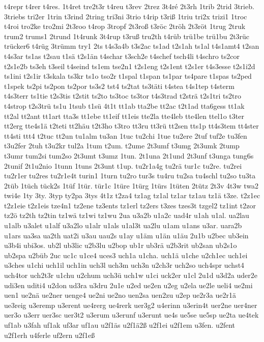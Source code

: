 {t4repr
t4rer
t4res.
1t4ret
tre2t3r
t4reu
t3rev
2trez
3t4ré
2t3rh
1trib
2trid
3trieb.
3triebs
tri2er
1trin
t3rind
2tring
tri3ni
3trio
t4rip
t3riß
1triu
tri2x
trizi1
1troc
t4roi
tro2ke
tro2mi
2t3roo
t4rop
3tropf
2t3roß
t3röc
2tröh
2t3röt
1trug
2truk
trum2
trums1
2trund
1t4runk
3t4rup
t3ruß
tru2th
t4rüb
trü1be
trü1bu
2t3rüc
trücker6
t4rüg
3trümm
try1
2ts
t4s3a4b
t3s2ac
ts1ad
t2s1ah
ts1al
t4s1amt4
t2san
t4s3ar
ts1as
t2sau
t1sä
t2s1än
t4schar
t3sch2e
t4schef
tsch4li
t4schro
ts2cor
t2s1e2b
ts3eh
t3seil
t4seind
ts1em
tse2n1
t2s1eng
t2s1ent
t2s1er
t4s3esse
t2s1i2d
ts1ini
t2s1ir
t3skala
ts3kr
ts1o
tso2r
t1spal
t1span
ts1par
ts4pare
t1spas
ts2ped
t1spek
ts2pi
ts2pon
ts2por
ts3s2
tst4
ts2tat
ts3täti
t4stea
t4s1tep
t4sterm
t4s3terr
ts1tie
t2s3tis
t2stit
ts2to
ts3toc
ts3tor
t4s3trad
t2strä
t2s1tri
ts2tro
t4strop
t2s3trü
ts1u
1tsub
t1sü
4t1t
tt1ab
tta2be
tt2ac
t2t1ad
tta6gess
tt1ak
tt2al
tt2ant
tt1art
tta3s
tt1ebe
tt1eif
tt1eis
tte2la
tte4leb
tte4len
ttel1o
t3ter
tt2erg
tte4s1ä
t2teti
tt2häu
t2t3ho
t3tro
tt3ru
tt3rü
tt2sen
tts1p
tt4s3tem
tt4ster
tt4sti
ttt4
t2tuc
tt2un
tu1alm
tu3an
1tuc
tu2chi
1tue
tu2ere
2tuf
tuf2e
tu3fen
t3u2fer
2tuh
t3u2kr
tul2a
1tum
t2um.
t2ume
2t3umf
t3umg
2t3umk
2tump
t3umr
tum2si
tum2so
2t3umt
t3umz
1tun.
2t1una
2t1und
2t3unf
t3unga
tung6s
2tunif
2t1u2nio
1tunn
1tuns
2t3unt
t1up.
tu2r1a4g
tu2rä
tur1c
tu2re.
tu2rei
tu2r1er
tu2res
tu2r1e4t
turin1
1turn
tu2ro
tur3s
tu4ru
tu2sa
tu4schl
tu2so
tu3ta
2tüb
1tüch
tück2s
1tüf
1tür.
tür1c
1türe
1türg
1türs
1tüten
2tütz
2t3v
4t3w
twa2
twi4e
1ty
3ty.
3typ
ty2pa
3tys
4t1z
t2za4
tz1ag
tz1al
tz1ar
tz1au
tz1ä
t3ze.
t2z1ec
t2z1eie
t2z1eis
tze4n1
tz2ene
tz3ents
tz1erl
tz2ers
t3zes
tzes3t
tzgel2
tz1int
t2zor
tz2ö
tz2th
tz2tin
tz1wä
tz1wi
tz1wu
2ua
u3a2b
u1a2c
uad4r
u1ah
u1al.
ua2lau
u1alb
u3alet
u1alf
u3a2lo
u1alr
u1als
u1al3t
ua2lu
u1am
u1ans
u3ar.
uara2b
u1ars
ua3sa
ua2th
uat2i
u3au
uau2s
u1ay
u1äm
u1än
u1äu
2u1b
u2bec
ub3ein
u3b4i
ubi3os.
ub2l
ub3lic
u2b3lu
u2bop
ub1r
ub3rä
u2b3rit
ub2san
ub2s1o
ub2spa
u2büb
2uc
uc1c
u1ce4
uces3
uch1a
u1cha.
uch1ä
u1che
u2ch1ec
uch1ei
u3ches
u1chi
uch1il
uch1in
uch3l
uch3m
uch3n
u2ch3r
uch2so
uch4spr
uchst4
uch4tor
uch2t3r
u1chu
u2chum
uch3ü
uch1w
u1ci
uck2er
u1cl
2u1d
u3d2a
uder2e
udi3en
uditi4
u2don
ud3ra
u3dru
2u1e
u2ed
ue2en
u2eg
u2ela
ue2le
ueli4
ue2mi
uen1
ue2nä
ue2ner
uenge4
ue2ni
ue2no
uen2sa
uen2zu
u2ep
ue2r3a
ue2r1ä
ue3reig
u3eremp
u3erent
ue4rerg
ue4rerk
uer3g2
u4erinn
u3erin4t
uer2ne
uer4ner
uer3o
u3err
uer3sc
uer3t2
u3erum
u3erunf
u3erunt
ue4s
ue5se
ue5sp
ue2ta
ue4tek
uf1ab
u3fah
uf1ak
uf3ar
uf1au
u2f1äs
u2f1ä2ß
u2f1ei
u2f1em
u3fen.
u2fent
u2f1erh
u4ferle
uf2ern
u2f1eß
}
